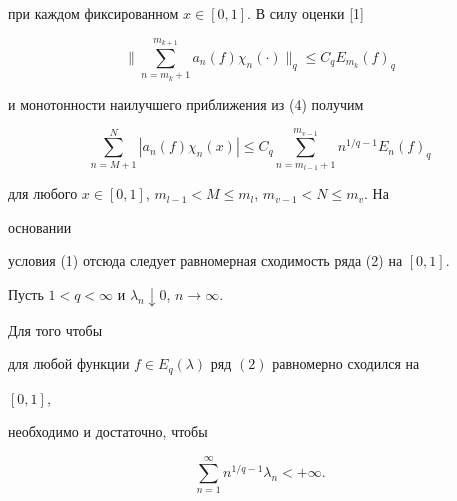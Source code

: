 \begin{pf}
\begin{equation}
\end{equation}  


при каждом фиксированном $x\in[0,1]$. В силу оценки [1]


$$ 


\bigg\|\sum^{m_{k+1}}_{n=m_k+1}a_n(f)\chi_n(\cdot) 


\bigg\|_q\le C_q E_{m_k}(f)_q 


$$ 


и монотонности наилучшего приближения из (4) получим


$$ 


\sum^N_{n=M+1}|a_n(f)\chi_n(x)|\le C_q 


\sum^{m_{v-1}}_{n=m_{l-1}+1}n^{1/q-1}E_n(f)_q 


$$ 


для любого $x\in[0,1]$, $m_{l-1}<M\le m_l$, $m_{v-1}<N\le m_v$. На 


основании 


условия (1) отсюда следует равномерная сходимость ряда (2) на $[0,1]$. 


\end{pf} 


 


\begin{thm} 


Пусть $1<q<\infty$ и $\lambda_n\downarrow0$, $n\to\infty$. 


Для того чтобы 


для любой функции $f\in E_q(\lambda)$ ряд $(2)$ равномерно сходился на 


$[0,1]$, 


необходимо и достаточно, чтобы 


\begin{equation} 


\sum^\infty_{n=1}n^{1/q-1}\lambda_n<+\infty. 


\end{equation} 


\end{thm} 


 


